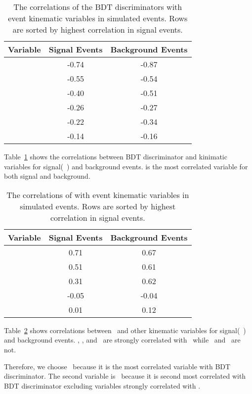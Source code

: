 \begin{table}[ht!]
	\begin{center}
	\begin{tabular}{l|c|c}
	\hline
	Variable        &   Signal Events   & Background Events \\ \hline
	\hline
	\mll        	&  -0.74      		&  -0.87 \\
	\ptlmin 		&  -0.55        	&  -0.54 \\
	\delphill    	&  -0.40       		&  -0.51  \\
 	\mt         	&  -0.26         	&  -0.27  \\
	\ptlmax  		&  -0.22       		&  -0.34 \\
	\met           	&  -0.14       		&  -0.16 \\
	\hline
	\end{tabular}
	\end{center}
	\caption{ The correlations of the BDT discriminators with event kinematic variables in simulated events.  
 		 	  Rows are sorted by highest correlation in signal events. }
	\label{tab:bdt_correlations}
\end{table}

Table~\ref{tab:bdt_correlations} shows the correlations between BDT discriminator and
kinimatic variables for signal(~\GeV) and background events. \mll is the most 
correlated variable for both signal and background.   

\begin{table}[ht!]
	\begin{center}
	\begin{tabular}{l|c|c}
	\hline
	Variable        &   Signal Events   & Background Events \\ \hline
	\hline
	\delphill    	&   0.71      	&  0.67 	\\
	\ptlmax  		&  	0.51       	&  0.61 	\\
	\ptlmin			&   0.31      	&  0.62	 	\\
	\met           	&  -0.05       	& -0.04 	\\
 	\mt         	&  	0.01       	&  0.12  	\\
	\hline
	\end{tabular}
	\end{center}
	\caption{ The correlations of \mll with event kinematic variables in simulated events.  
 		 	  Rows are sorted by highest correlation in signal events. }
	\label{tab:mll_correlations}
\end{table} 

Table~\ref{tab:mll_correlations} shows correlations between \mll~and other kinematic variables
for signal(~\GeV) and background events. \delphill, \ptlmax, and \ptlmin~are strongly 
correlated with \mll~while \met~and \mt~are not.

Therefore, we choose \mll~because it is the most correlated variable with BDT discriminator.
The second variable is \mt~because it is second most correlated with BDT discriminator 
excluding variables strongly correlated with \mll.
